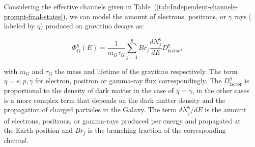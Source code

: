 \documentclass[a4paper,11pt]{article}
\begin{document}

Considering the effective channels given in Table~(\ref{tab:Independent-channels-prompt-final-states}), we can  model the amount of electrons, positrons, or $\gamma$ rays ( labeled by $\eta$) produced on gravitino decays as:

\begin{equation}
\Phi_{G}^{\eta}(E) = \frac{1}{m_G \tau_G} \sum_{j=1}^9 {Br_j \frac{dN_j^{\eta}}{dE}} D^{\eta}_{\text{factor}},
\label{dm-flux}
\end{equation}

\noindent with $m_G$ and $\tau_G$ the mass and lifetime of the gravitino respectively. The term $\eta = e, p,\gamma$ for electron, positron or gamma-ray flux correspondingly. The $D^{\eta}_{\text{factor}}$ is proportional to the density of dark matter in the case of $\eta=\gamma$, in the other cases is a more complex term that depends on the dark matter density and the propagation of charged particles in the Galaxy. The term $dN_j^{\eta}/dE$ is the amount of electrons, positrons, or gamma-rays produced per energy and propagated at the Earth position and $Br_j$ is the branching fraction of the corresponding channel.
\end{document}
